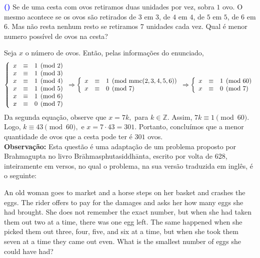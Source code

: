 \documentclass[12pt, a4paper]{article}
\newcommand{\mmc}{{\rm mmc}}
\newcounter{exercicio}[section]
\newenvironment{exercicio}[1][]{\refstepcounter{exercicio}\par\medskip
 \textcolor{blue}{\bf(\theexercicio)} \rmfamily}{\medskip }
\begin{document}
\begin{exercicio}
Se de uma cesta com ovos retiramos duas unidades por vez, sobra $1$ ovo. O mesmo acontece se os ovos são retirados de $3$ em $3$, de $4$ em $4$, de $5$ em $5$, de $6$ em $6$. Mas não resta nenhum resto se retiramos $7$ unidades cada vez. Qual é menor numero possível de ovos na cesta?
\end{exercicio}
\begin{solution}
Seja $x$ o número de ovos. Então, pelas informações do enunciado, 
$$\left\{\begin{array}{lcr}
    x&\equiv&1\pmod2\\
    x&\equiv&1\pmod3\\
    x&\equiv&1\pmod4\\
    x&\equiv&1\pmod5\\
    x&\equiv&1\pmod6\\
    x&\equiv&0\pmod7 
\end{array}\right.\Rightarrow
\left\{\begin{array}{lcl}
    x&\equiv&1 \pmod{\mmc(2,3,4,5,6)}\\
    x&\equiv&0\pmod7
\end{array}\right.\Rightarrow 
\left\{\begin{array}{lcl}
    x&\equiv&1\pmod{60}\\
    x&\equiv&0\pmod7
\end{array}\right.$$
Da segunda equação, observe que $x = 7k,$ para $k \in \mathbb{Z}.$ Assim, $7k \equiv 1 \pmod{60}.$ Logo, $k \equiv 43 \pmod 60,$ e $x = 7 \cdot 43 = 301.$
Portanto, concluímos que a menor quantidade de ovos que a cesta pode ter é $301$ ovos.\\
\textbf{Observação:} Esta questão é uma adaptação de um problema proposto por Brahmagupta no livro Brāhmasphutasiddhānta, escrito por volta de 628, inteiramente em versos, no qual o problema, na sua versão traduzida em inglês, é o seguinte:

An old woman goes to market and a horse steps on her basket and crashes the eggs. The rider offers to pay for the damages and asks her how many eggs she had brought. She does not remember the exact number, but when she had taken them out two at a time, there was one egg left. The same happened when she picked them out three, four, five, and six at a time, but when she took them seven at a time they came out even. What is the smallest number of eggs she could have had?
\end{solution}
\end{document}

